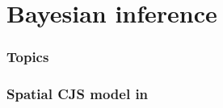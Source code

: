 \documentclass[color=usenames,dvipsnames]{beamer}\usepackage[]{graphicx}\usepackage[]{color}
\begin{document}
\section{Bayesian inference}




\begin{frame}[plain]
  \frametitle{Topics}
  \Large
  \tableofcontents[currentsection]
\end{frame}



\begin{frame}[fragile]
  \frametitle{Spatial CJS model in \jags}
  \vspace{-3mm}
  \tiny \fbox{\parbox{\linewidth}{}}
\end{frame}
\end{document}
